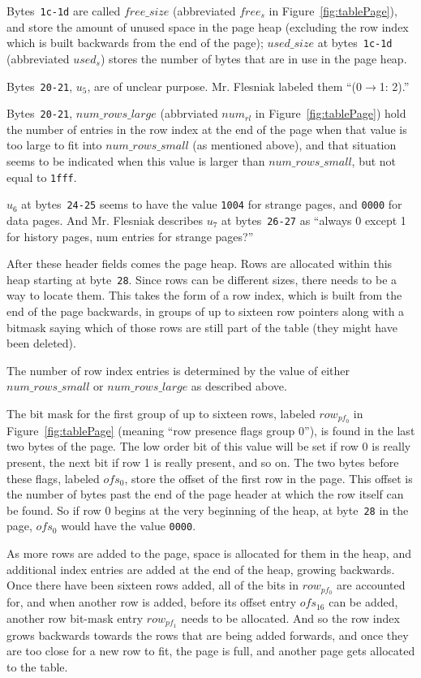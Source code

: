 \documentclass[11pt]{article}
\begin{document}
Bytes~{\tt 1c-1d} are called $free\_size$ (abbreviated $free_s$ in
Figure~\ref{fig:tablePage}), and store the amount of unused space in
the page heap (excluding the row index which is built backwards from
the end of the page); $used\_size$ at bytes~{\tt 1c-1d} (abbreviated
$used_s$) stores the number of bytes that are in use in the page heap.

Bytes~{\tt 20-21}, $u_5$, are of unclear purpose. Mr. Flesniak labeled
them ``(0$\rightarrow$1: 2).''

Bytes~{\tt 20-21}, $num\_rows\_large$ (abbrviated $num_{rl}$ in
Figure~\ref{fig:tablePage}) hold the number of entries in the row
index at the end of the page when that value is too large to fit into
$num\_rows\_small$ (as mentioned above), and that situation seems to
be indicated when this value is larger than $num\_rows\_small$, but
not equal to {\tt 1fff}.

$u_6$ at bytes~{\tt 24-25} seems to have the value {\tt 1004} for
strange pages, and {\tt 0000} for data pages. And Mr. Flesniak
describes $u_7$ at bytes~{\tt 26-27} as ``always 0 except 1 for
history pages, num entries for strange pages?''

After these header fields comes the page heap. Rows are allocated
within this heap starting at byte~{\tt 28}. Since rows can be
different sizes, there needs to be a way to locate them. This takes
the form of a row index, which is built from the end of the page
backwards, in groups of up to sixteen row pointers along with a
bitmask saying which of those rows are still part of the table (they
might have been deleted).

The number of row index entries is determined by the value of either
$num\_rows\_small$ or $num\_rows\_large$ as described above.

The bit mask for the first group of up to sixteen rows, labeled
$row_{pf_0}$ in Figure~\ref{fig:tablePage} (meaning ``row presence
flags group 0''), is found in the last two bytes of the page. The low
order bit of this value will be set if row 0 is really present, the
next bit if row 1 is really present, and so on. The two bytes before
these flags, labeled $ofs_0$, store the offset of the first row in the
page. This offset is the number of bytes past the end of the page
header at which the row itself can be found. So if row 0 begins at the
very beginning of the heap, at byte~{\tt 28} in the page, $ofs_0$
would have the value {\tt 0000}.

As more rows are added to the page, space is allocated for them in the
heap, and additional index entries are added at the end of the heap,
growing backwards. Once there have been sixteen rows added, all of the
bits in $row_{pf_0}$ are accounted for, and when another row is added,
before its offset entry $ofs_{16}$ can be added, another row bit-mask
entry $row_{pf_1}$ needs to be allocated. And so the row index grows
backwards towards the rows that are being added forwards, and once
they are too close for a new row to fit, the page is full, and another
page gets allocated to the table.
\end{document}
